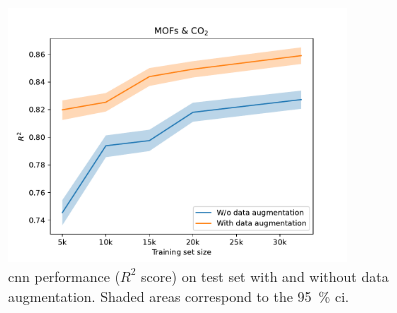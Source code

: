 \begin{figure}
	\centering
	\includegraphics[width=0.8\textwidth]{fig/data_augmentation.pdf}
	\caption[Effect of data augmentation.]{\gls{cnn} performance ($R^2$ score)
	on test set with and without data augmentation. Shaded areas correspond to the \SI{95}{\percent}
	\gls{ci}.}
	\label{fig:data_augmentation}
\end{figure}
